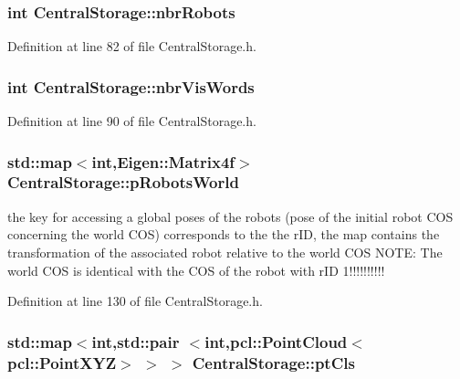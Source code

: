 \hypertarget{classCentralStorage_a83a67f52de30d339d872138243d42764}{
\subsubsection[{nbr\-Robots}]{\setlength{\rightskip}{0pt plus 5cm}int {\bf \-Central\-Storage\-::nbr\-Robots}}}\label{classCentralStorage_a83a67f52de30d339d872138243d42764}


\-Definition at line 82 of file \-Central\-Storage.\-h.

\hypertarget{classCentralStorage_a6830253bfbd8a4c03cc317820358d25a}{
\subsubsection[{nbr\-Vis\-Words}]{\setlength{\rightskip}{0pt plus 5cm}int {\bf \-Central\-Storage\-::nbr\-Vis\-Words}}}\label{classCentralStorage_a6830253bfbd8a4c03cc317820358d25a}


\-Definition at line 90 of file \-Central\-Storage.\-h.

\hypertarget{classCentralStorage_ae701316885fe7f1366f17ec44393b84b}{
\subsubsection[{p\-Robots\-World}]{\setlength{\rightskip}{0pt plus 5cm}std\-::map$<$int,\-Eigen\-::\-Matrix4f$>$ {\bf \-Central\-Storage\-::p\-Robots\-World}}}\label{classCentralStorage_ae701316885fe7f1366f17ec44393b84b}
the key for accessing a global poses of the robots (pose of the initial robot \-C\-O\-S concerning the world \-C\-O\-S) corresponds to the the r\-I\-D, the map contains the transformation of the associated robot relative to the world \-C\-O\-S \-N\-O\-T\-E\-: \-The world \-C\-O\-S is identical with the \-C\-O\-S of the robot with r\-I\-D 1!!!!!!!!!! 

\-Definition at line 130 of file \-Central\-Storage.\-h.

\hypertarget{classCentralStorage_a98df05b89e7956601eeff266fbef0754}{
\subsubsection[{pt\-Cls}]{\setlength{\rightskip}{0pt plus 5cm}std\-::map$<$int,std\-::pair $<$int,pcl\-::\-Point\-Cloud$<$pcl\-::\-Point\-X\-Y\-Z$>$ $>$ $>$ {\bf \-Central\-Storage\-::pt\-Cls}}}\label{classCentralStorage_a98df05b89e7956601eeff266fbef0754}


